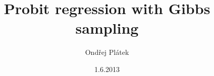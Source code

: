 \documentclass[12pt,a4paper]{report}
\title{Probit regression with Gibbs sampling}
\date{1.6.2013}
\author{Ondřej Plátek}
\begin{document}
\pagestyle{plain}
\setcounter{page}{1}

\theoremstyle{plain}
\newtheorem{thm}{Theorem}[chapter] %

\theoremstyle{definition}
\newtheorem{defn}[thm]{Definition} %
\newtheorem{exmp}[thm]{Example} %
\end{document}
